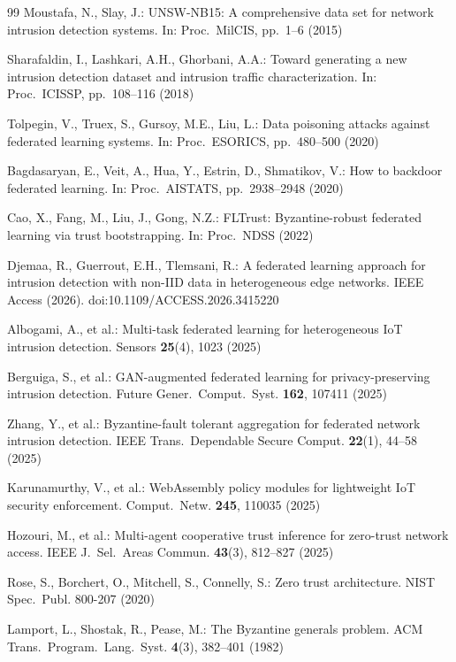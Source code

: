 \documentclass[sn-mathphys,Numbered]{sn-jnl}
\begin{document}
\begin{thebibliography}{99}
Moustafa, N., Slay, J.:
UNSW-NB15: A comprehensive data set for network intrusion detection systems.
In: Proc.\ MilCIS, pp.\ 1--6 (2015)

Sharafaldin, I., Lashkari, A.H., Ghorbani, A.A.:
Toward generating a new intrusion detection dataset and intrusion traffic characterization.
In: Proc.\ ICISSP, pp.\ 108--116 (2018)

Tolpegin, V., Truex, S., Gursoy, M.E., Liu, L.:
Data poisoning attacks against federated learning systems.
In: Proc.\ ESORICS, pp.\ 480--500 (2020)

Bagdasaryan, E., Veit, A., Hua, Y., Estrin, D., Shmatikov, V.:
How to backdoor federated learning.
In: Proc.\ AISTATS, pp.\ 2938--2948 (2020)

Cao, X., Fang, M., Liu, J., Gong, N.Z.:
FLTrust: Byzantine-robust federated learning via trust bootstrapping.
In: Proc.\ NDSS (2022)

Djemaa, R., Guerrout, E.H., Tlemsani, R.:
A federated learning approach for intrusion detection with non-IID data in heterogeneous edge networks.
IEEE Access (2026). doi:10.1109/ACCESS.2026.3415220

Albogami, A., et al.:
Multi-task federated learning for heterogeneous IoT intrusion detection.
Sensors \textbf{25}(4), 1023 (2025)

Berguiga, S., et al.:
GAN-augmented federated learning for privacy-preserving intrusion detection.
Future Gener.\ Comput.\ Syst. \textbf{162}, 107411 (2025)

Zhang, Y., et al.:
Byzantine-fault tolerant aggregation for federated network intrusion detection.
IEEE Trans.\ Dependable Secure Comput. \textbf{22}(1), 44--58 (2025)

Karunamurthy, V., et al.:
WebAssembly policy modules for lightweight IoT security enforcement.
Comput.\ Netw. \textbf{245}, 110035 (2025)

Hozouri, M., et al.:
Multi-agent cooperative trust inference for zero-trust network access.
IEEE J.\ Sel.\ Areas Commun. \textbf{43}(3), 812--827 (2025)

Rose, S., Borchert, O., Mitchell, S., Connelly, S.:
Zero trust architecture.
NIST Spec.\ Publ. 800-207 (2020)

Lamport, L., Shostak, R., Pease, M.:
The Byzantine generals problem.
ACM Trans.\ Program.\ Lang.\ Syst. \textbf{4}(3), 382--401 (1982)

\end{thebibliography}
\end{document}
